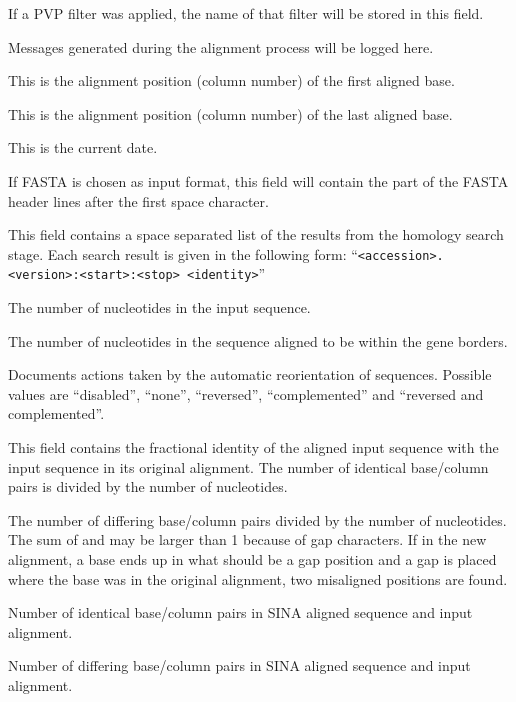 \documentclass[english,a4paper]{article}
\begin{document}
\begin{Description}
\item[\Arg{align\_filter\_slv}]
  If a PVP filter was applied, the name of that filter will be stored in this field. 
\item[\Arg{align\_log\_slv}]
  Messages generated during the alignment process will be logged here. 
\item[\Arg{align\_startpos\_slv}]
  This is the alignment position (column number) of the first aligned base.
\item[\Arg{align\_stoppos\_slv}]
  This is the alignment position (column number) of the last aligned base.
\item[\Arg{aligned\_slv}]
  This is the current date.
\item[\Arg{full\_name}]
  If FASTA is chosen as input format, this field will contain the part of the FASTA
  header lines after the first space character.
\item[\Arg{nearest\_slv}]
  This field contains a space separated list of the results from the homology 
 search stage. Each search result is given in the following form:
 ``\texttt{<accession>.<version>:<start>:<stop>~<identity>}''
\item[\Arg{nuc}]
  The number of nucleotides in the input sequence.
\item[\Arg{nuc\_gene\_slv}]
  The number of nucleotides in the sequence aligned to be within the gene borders.
\item[\Arg{turn\_slv}]
  Documents actions taken by the automatic reorientation of sequences. Possible values
  are ``disabled'', ``none'', ``reversed'', ``complemented'' and 
  ``reversed and complemented''.
\item[\Arg{sps}]
  This field contains the fractional identity of the aligned input sequence with 
  the input sequence in its original alignment. The number of identical base/column
  pairs is divided by the number of nucleotides. 
\item[\Arg{error}]
  The number of differing base/column pairs divided by the number of nucleotides.
  The sum of  and  may be larger than 1 because of gap characters.
  If in the new alignment, a base ends up in what should be a gap position and a gap
  is placed where the base was in the original alignment, two misaligned positions
  are found.
\item[\Arg{matches}]
  Number of identical base/column pairs in SINA aligned sequence and input alignment.
\item[\Arg{mismatches}]
  Number of differing base/column pairs in SINA aligned sequence and input alignment.

\end{Description}
\end{document}

